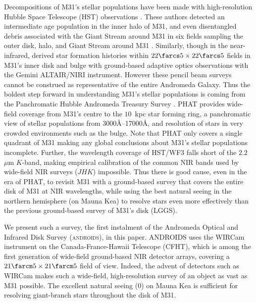 \documentclass[iop]{emulateapj}
\newcommand{\androids}{\textsc{androids}}
\begin{document}
Decompositions of M31's stellar populations have been made with high-resolution Hubble Space Telescope (HST) observations \citep{Brown:2003,Brown:2006,Brown:2008}.
These authors detected an intermediate age population in the inner halo of M31, and even disentangled debris associated with the Giant Stream around M31 in six fields sampling the outer disk, halo, and Giant Stream around M31 \citep{Brown:2009a}.
Similarly, though in the near-infrared, \cite{Olsen:2006} derived star formation histories within $22\farcs5\times22\farcs5$ fields in M31's inner disk and bulge with ground-based adaptive optics observations with the Gemini ALTAIR/NIRI instrument.
However these pencil beam surveys cannot be construed as representative of the entire Andromeda Galaxy.
Thus the boldest step forward in understanding M31's stellar populations is coming from the Panchromatic Hubble Andromeda Treasury Survey \citep[PHAT,][]{Dalcanton:2012}.
PHAT provides wide-field coverage from M31's centre to the $10$~kpc star forming ring, a panchromatic view of stellar populations from 3000\AA--17000\AA, and resolution of stars in very crowded environments such as the bulge.
Note that PHAT only covers a single quadrant of M31 making any global conclusions about M31's stellar populations incomplete.
Further, the wavelength coverage of HST/WF3 falls short of the $2.2$~$\mu$m $K$-band, making empirical calibration of the common NIR bands used by wide-field NIR surveys ($JHK$) impossible.
Thus there is good cause, even in the era of PHAT, to revisit M31 with a ground-based survey that covers the entire disk of M31 at NIR wavelengths, while using the best natural seeing in the northern hemisphere (on Mauna Kea) to resolve stars even more effectively than the previous ground-based survey of M31's disk (LGGS).

We present such a survey, the first instalment of the Andromeda Optical and Infrared Disk Survey (\androids), in this paper.
ANDROIDS uses the WIRCam instrument \citep{Puget:2004} on the Canada-France-Hawaii Telescope (CFHT), which is among the first generation of wide-field ground-based NIR detector arrays, covering a $21\farcm 5 \times 21\farcm 5$ field of view.
Indeed, the advent of detectors such as WIRCam makes such a wide-field, high-resolution survey of an object as vast as M31 possible.
The excellent natural seeing (0) on Mauna Kea is sufficient for resolving giant-branch stars throughout the disk of M31.
\end{document}
